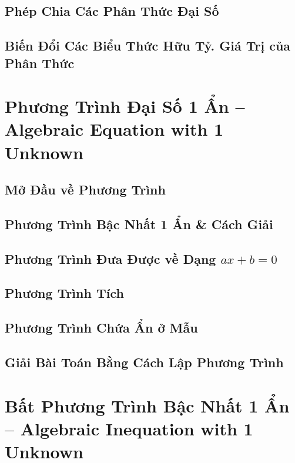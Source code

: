 \documentclass[oneside]{book}
\numberwithin{equation}{section}
\begin{document}
\section{Phép Chia Các Phân Thức Đại Số}

\section{Biến Đổi Các Biểu Thức Hữu Tỷ. Giá Trị của Phân Thức}


\chapter{Phương Trình Đại Số 1 Ẩn -- Algebraic Equation with 1 Unknown}

\section{Mở Đầu về Phương Trình}

\section{Phương Trình Bậc Nhất 1 Ẩn \& Cách Giải}

\section{Phương Trình Đưa Được về Dạng $ax + b = 0$}

\section{Phương Trình Tích}

\section{Phương Trình Chứa Ẩn ở Mẫu}

\section{Giải Bài Toán Bằng Cách Lập Phương Trình}


\chapter{Bất Phương Trình Bậc Nhất 1 Ẩn -- Algebraic Inequation with 1 Unknown}
\end{document}
